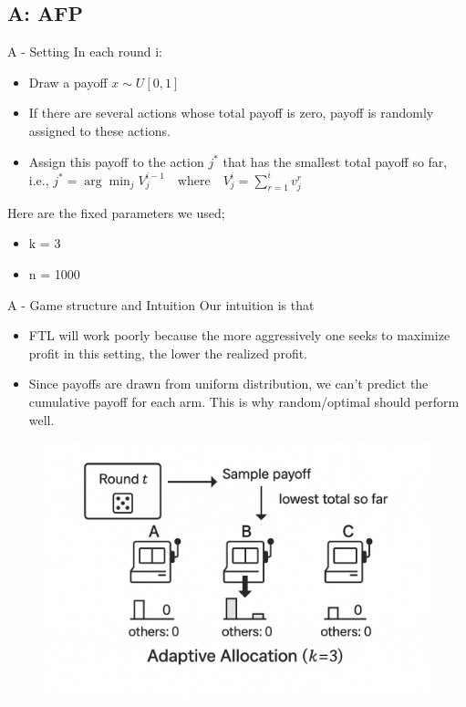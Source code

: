 \documentclass{beamer}
\begin{document}
\subsection{A: AFP}

\begin{frame}{A - Setting}
    In each round i:
    \begin{itemize}
        \item Draw a payoff $x \sim U[0,1]$
        \item If there are several actions whose total payoff is zero, payoff is randomly assigned to these actions.
        \item Assign this payoff to the action $j^*$ that has the smallest total payoff so far,\\
        i.e., $j^* = \arg\min_j V^{i-1}_{j} \quad \text{where} \quad V^{i}_{j} = \sum_{r=1}^{i} v^{r}_{j}$
    \end{itemize}
    \vspace{1em}
    Here are the fixed parameters we used;
    \begin{itemize}
        \item k = 3
        \item n = 1000
    \end{itemize}
\end{frame}

\begin{frame}{A - Game structure and Intuition}
    Our intuition is that
    \begin{itemize}
        \item FTL will work poorly because the more aggressively one seeks to maximize profit in this setting, the lower the realized profit.
        \item Since payoffs are drawn from uniform distribution, we can't predict the cumulative payoff for each arm. This is why random/optimal should perform well.
    \end{itemize}
    \begin{figure}
        \centering
        \includegraphics[width=0.5\linewidth]{../figures/Image_A.png}
        \label{fig:placeholder}
    \end{figure}
\end{frame}
\end{document}
